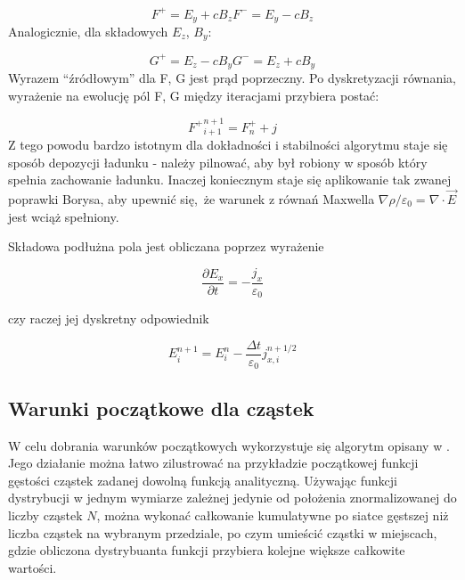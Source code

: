 
    \begin{equation}
        F^{+} = E_y + c B_z
        F^{-} = E_y - c B_z
        \label{eqn:Birdsall-electromagnetic-quantities}
    \end{equation}
    Analogicznie, dla składowych $E_z$, $B_y$:

    \begin{equation}
        G^{+} = E_z - c B_y
        G^{-} = E_z + c B_y
        \label{eqn:Birdsall-electromagnetic-quantities-alternate-axes}
    \end{equation}
    Wyrazem ``źródłowym'' dla F, G jest prąd poprzeczny. Po dyskretyzacji równania, wyrażenie na ewolucję pól F, G między
    iteracjami przybiera postać:

    \begin{equation}
        {F^{+}}^{n+1}_{i+1} = F^{+}_{n} + j
    \end{equation}
    Z tego powodu bardzo istotnym dla dokładności i stabilności algorytmu staje się sposób depozycji ładunku - należy pilnować,
    aby był robiony w sposób który spełnia zachowanie ładunku. Inaczej koniecznym staje się aplikowanie tak zwanej
    poprawki Borysa, 
    aby upewnić się, że warunek z równań Maxwella $\nabla \rho / \varepsilon_0 = \nabla \cdot \vec{E}$ jest
    wciąż spełniony.

    Składowa podłużna pola jest obliczana poprzez wyrażenie

    \begin{equation}
    \frac{\partial E_x}{\partial t} = - \frac{j_x}{\varepsilon_0}
    \label{longitudinal-field-differential}
    \end{equation}

    czy raczej jej dyskretny odpowiednik

    \begin{equation}
        E_i^{n+1} = E_i^n - \frac{\Delta t}{\varepsilon_0} j_{x,i}^{n+1/2}
    \label{longitudinal-field-finite-differential}
    \end{equation}


    \subsection{Warunki początkowe dla cząstek}

    W celu dobrania warunków początkowych wykorzystuje się algorytm opisany w .
    Jego działanie można łatwo zilustrować na przykładzie początkowej funkcji gęstości cząstek zadanej
    dowolną funkcją analityczną. 
    Używając funkcji dystrybucji w jednym wymiarze zależnej jedynie od położenia znormalizowanej do
    liczby cząstek $N$, można wykonać całkowanie kumulatywne po siatce gęstszej niż liczba cząstek
    na wybranym przedziale, po czym umieścić cząstki w miejscach, gdzie obliczona dystrybuanta funkcji
    przybiera kolejne większe całkowite wartości.

